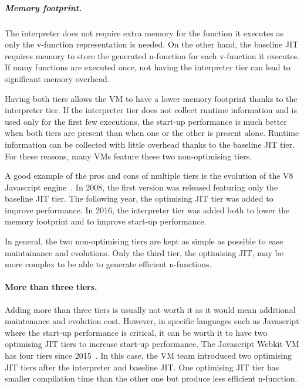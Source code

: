\documentclass[a4paper,12pt,twoside]{../includes/ThesisStyle}
\begin{document}
	\subparagraph{Memory footprint.}The interpreter does not require extra memory for the function it executes as only the v-function representation is needed. On the other hand, the baseline JIT requires memory to store the generated n-function for each v-function it executes. If many functions are executed once, not having the interpreter tier can lead to significant memory overhead.
	

\vspace{0.5em}

Having both tiers allows the VM to have a lower memory footprint thanks to the interpreter tier. If the interpreter tier does not collect runtime information and is used only for the first few executions, the start-up performance is much better when both tiers are present than when one or the other is present alone. Runtime information can be collected with little overhead thanks to the baseline JIT tier. For these reasons, many VMs feature these two non-optimising tiers. 

A good example of the pros and cons of multiple tiers is the evolution of the V8 Javascript engine~\cite{V8}. In 2008, the first version was released featuring only the baseline JIT tier. The following year, the optimising JIT tier was added to improve performance. In 2016, the interpreter tier was added both to lower the memory footprint and to improve start-up performance.

In general, the two non-optimising tiers are kept as simple as possible to ease maintainance and evolutions. Only the third tier, the optimising JIT, may be more complex to be able to generate efficient n-functions.

\paragraph{More than three tiers.} Adding more than three tiers is usually not worth it as it would mean additional maintenance and evolution cost. However, in specific languages such as Javascript where the start-up performance is critical, it can be worth it to have two optimising JIT tiers to increase start-up performance. The Javascript Webkit VM has four tiers since 2015~\cite{Webkit15}. In this case, the VM team introduced two optimising JIT tiers after the interpreter and baseline JIT. One optimising JIT tier has smaller compilation time than the other one but produce less efficient n-function.
\end{document}
